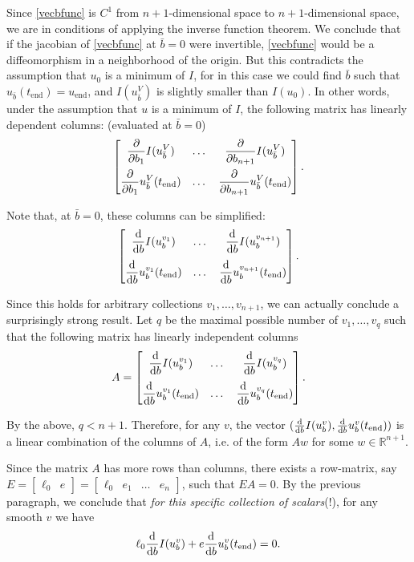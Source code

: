 \documentclass{article}
\theoremstyle{plain}
\theoremstyle{plain}
\theoremstyle{nonumberplain}
\theoremstyle{empty}
\newcommand{\R}{\mathbb{R}}
\newcommand{\tend}{\mathrm{end}}
\newcommand{\vecb}{{\bar{b}}}
\begin{document}
Since \eqref{vecbfunc} is $C^1$ from $n+1$-dimensional space to $n+1$-dimensional space, we are in conditions of applying the inverse function theorem. We conclude that if the jacobian of \eqref{vecbfunc} at $\vecb = 0$ were invertible, \eqref{vecbfunc} would be a diffeomorphism in a neighborhood of the origin. But this contradicts the assumption that $u_0$ is a minimum of $I$, for in this case we could find $\vecb$ such that $u_\vecb(t_\tend) = u_\tend$, and $I(u_\vecb^V)$ is slightly smaller than $I(u_0)$. In other words, under the assumption that $u$ is a minimum of $I$, the following matrix has linearly dependent columns: (evaluated at $\vecb = 0$)
\[
\begin{bmatrix}
\displaystyle \diffp*{I(u_\vecb^V)}{b_1} & \dots & \displaystyle \diffp*{I(u_\vecb^V)}{b_{n+1}}\\[1em]
\displaystyle \diffp*{u_\vecb^V(t_\tend)}{b_1} & \dots &\displaystyle \diffp*{u_\vecb^V(t_\tend)}{b_{n+1}}
\end{bmatrix}.
\]

Note that, at $\vecb = 0$, these columns can be simplified:
\[
\begin{bmatrix}
\displaystyle \diff*{I(u_b^{v_1})}{b} & \dots & \displaystyle \diff*{I(u_b^{v_{n+1}})}{b}\\[1em]
\displaystyle \diff*{u_b^{v_1}(t_\tend)}{b} & \dots & \displaystyle \diff*{u_b^{v_{n+1}}(t_\tend)}{b}
\end{bmatrix}.
\]

Since this holds for arbitrary collections $v_1, \dots, v_{n+1}$, we can actually conclude a surprisingly strong result. Let $q$ be the maximal possible number of $v_1, \dots, v_q$ such that the following matrix has linearly independent columns
\[
A =
\begin{bmatrix}
\displaystyle \diff*{I(u_b^{v_1})}{b} & \dots & \displaystyle \diff*{I(u_b^{v_{q}})}{b}\\[1em]
\displaystyle \diff*{u_b^{v_1}(t_\tend)}{b} & \dots & \displaystyle \diff*{u_b^{v_{q}}(t_\tend)}{b}
\end{bmatrix}.
\]

By the above, $q < n+1$. Therefore, for any $v$, the vector $(\diff*{I(u_b^v)}{b}, \diff*{u_b^v(t_\tend)}{b})$ is a linear combination of the columns of $A$, i.e. of the form $Aw$ for some $w \in \R^{n+1}$.

Since the matrix $A$ has more rows than columns, there exists a row-matrix, say $E = \begin{bmatrix} \ell_0 & e \end{bmatrix} = \begin{bmatrix} \ell_0 & e_1 & \dots & e_n\end{bmatrix}$, such that $E A = 0$. By the previous paragraph, we conclude that \emph{for this specific collection of scalars}(!), for any smooth $v$ we have
\begin{equation}\label{premultiplier}
\ell_0 \diff*{I(u_b^v)}{b} + e \diff*{u_b^v(t_\tend)}{b} = 0.
\end{equation}
\end{document}
